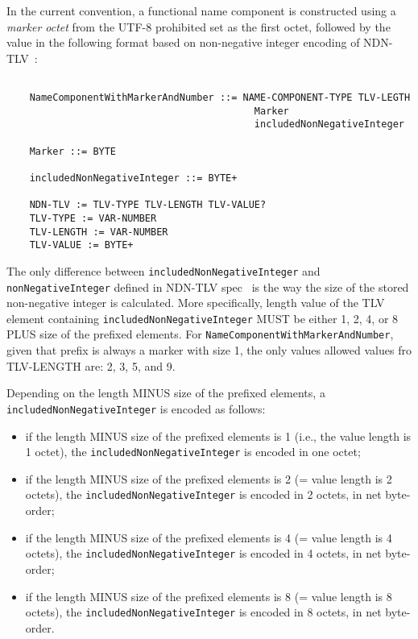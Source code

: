 In the current convention, a functional name component is constructed using a \emph{marker octet} from the UTF-8 prohibited set as the first octet, followed by the value in the following format based on non-negative integer encoding of NDN-TLV~\cite{ndn-tlv}:

\vspace{0.2cm}

\begin{minipage}[c]{0.5\textwidth}
\begin{verbatim}

    NameComponentWithMarkerAndNumber ::= NAME-COMPONENT-TYPE TLV-LEGTH
                                           Marker
                                           includedNonNegativeInteger

    Marker ::= BYTE

    includedNonNegativeInteger ::= BYTE+

    NDN-TLV := TLV-TYPE TLV-LENGTH TLV-VALUE?
    TLV-TYPE := VAR-NUMBER
    TLV-LENGTH := VAR-NUMBER
    TLV-VALUE := BYTE+

\end{verbatim}
\end{minipage}

The only difference between \texttt{includedNonNegativeInteger} and \texttt{nonNegativeInteger} defined in NDN-TLV spec~\cite{ndn-tlv} is the way the size of the stored non-negative integer is calculated.
More specifically, length value of the TLV element containing \texttt{includedNonNegativeInteger} MUST be either 1, 2, 4, or 8 PLUS size of the prefixed elements.
For \texttt{NameComponentWithMarkerAndNumber}, given that prefix is always a marker with size 1, the only values allowed values fro TLV-LENGTH are: 2, 3, 5, and 9.

Depending on the length MINUS size of the prefixed elements, a \texttt{includedNonNegativeInteger} is encoded as follows:
\begin{itemize}
\item if the length MINUS size of the prefixed elements is 1 (i.e., the value length is 1 octet), the \texttt{inclu\-dedNonNe\-ga\-ti\-veInteger} is encoded in one octet;
\item if the length MINUS size of the prefixed elements is 2 (= value length is 2 octets), the \texttt{inclu\-dedNonNe\-ga\-ti\-veInteger} is encoded in 2 octets, in net byte-order;
\item if the length MINUS size of the prefixed elements is 4 (= value length is 4 octets), the \texttt{includedNonNe\-ga\-ti\-veInteger} is encoded in 4 octets, in net byte-order;
\item if the length MINUS size of the prefixed elements is 8 (= value length is 8 octets), the \texttt{includedNonNe\-ga\-ti\-veInteger} is encoded in 8 octets, in net byte-order.
\end{itemize}


